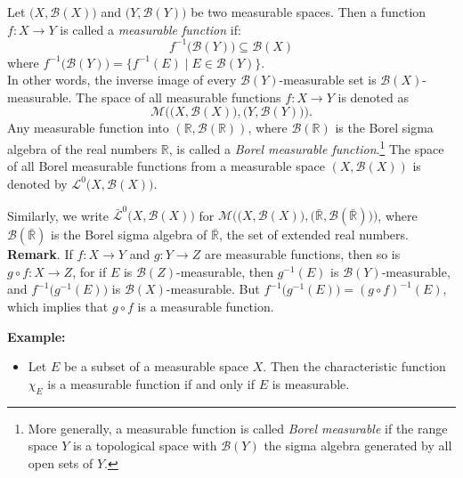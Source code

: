 \documentclass[12pt]{article}
\begin{document}
Let $\big(X,\mathcal{B}(X)\big)$ and $\big(Y, \mathcal{B}(Y)\big)$ be two measurable spaces.  Then a function $f\colon X\to Y$ is called a \emph{measurable function} if:
$$f^{-1}\big(\mathcal{B}(Y)\big) \subseteq \mathcal{B}(X)$$
where $f^{-1}\big(\mathcal{B}(Y)\big) = \{f^{-1}(E)\mid E\in\mathcal{B}(Y)\}$.\\  

In other words,  the inverse image of every $\mathcal{B}(Y)$-measurable set is $\mathcal{B}(X)$-measurable.  The space of all measurable functions $f\colon X\to Y$ is denoted as $$\mathcal{M}\big(\big(X,\mathcal{B}(X)\big),\big(Y, \mathcal{B}(Y)\big)\big).$$  Any measurable function into $(\mathbb{R},\mathcal{B}(\mathbb{R}))$, where $\mathcal{B}(\mathbb{R})$ is the Borel sigma algebra of the real numbers $\mathbb{R}$, is called a \emph{Borel measurable function}.{\footnote {More generally, a measurable function is called \emph{Borel measurable} if the range space $Y$ is a topological space with $\mathcal{B}(Y)$ the sigma algebra generated by all open sets of $Y$.}}   The space of all Borel measurable functions from a measurable space $(X,\mathcal{B}(X))$ is denoted by  $\displaystyle{\mathcal{L}^0\big(X,\mathcal{B}(X)\big)}$.  

Similarly, we write $\displaystyle{\bar{\mathcal{L}}^0\big(X,\mathcal{B}(X)\big)}$ for  $\displaystyle{\mathcal{M}\big(\big(X,\mathcal{B}(X)), (\bar{\mathbb{R}},\mathcal{B}(\bar{\mathbb{R}})\big)\big)}$, where $\mathcal{B}(\bar{\mathbb{R}})$ is the Borel sigma algebra of $\bar{\mathbb{R}}$, the set of extended real numbers. \\

\textbf{Remark}.  If $f:X\to Y$ and $g:Y\to Z$ are measurable functions, then so is $g\circ f:X\to Z$, for if $E$ is $\mathcal{B}(Z)$-measurable, then $g^{-1}(E)$ is $\mathcal{B}(Y)$-measurable, and $f^{-1}\big(g^{-1}(E)\big)$ is $\mathcal{B}(X)$-measurable.  But $f^{-1}\big(g^{-1}(E)\big)=(g\circ f)^{-1}(E)$, which implies that $g\circ f$ is a measurable function.

\textbf{Example:}
\begin{itemize}
\item Let $E$ be a subset of a measurable space $X$.  Then the characteristic function $\chi_E$ is a measurable function if and only if $E$ is measurable.
\end{itemize}
\end{document}
